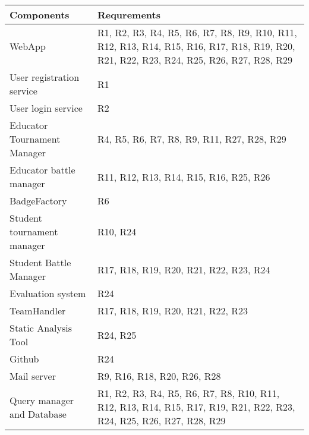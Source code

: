 \documentclass[a4paper, 11pt, titlepage]{article}
\begin{document}
\begin{center}
  \begin{tabularx}{\linewidth} {| l | X |}
    \hline
    Components & Requrements\\
    \hline
    WebApp& R1, R2, R3, R4, R5, R6, R7, R8, R9, R10, R11, R12, R13, R14, R15, R16, R17, R18, R19, R20, R21, R22, R23, R24, R25, R26, R27, R28, R29\\
    \hline
    User registration service& R1\\
    \hline
    User login service& R2\\
    \hline
    Educator Tournament Manager&R4, R5, R6, R7, R8, R9, R11, R27, R28, R29\\
    \hline
    Educator battle manager& R11, R12, R13, R14, R15, R16, R25, R26\\
    \hline
    BadgeFactory &R6\\
    \hline
    Student tournament manager&R10, R24\\
    \hline
    Student Battle Manager&R17, R18, R19, R20, R21, R22, R23, R24\\
    \hline
    Evaluation system&R24\\
    \hline
    TeamHandler& R17, R18, R19, R20, R21, R22, R23\\
    \hline
    Static Analysis Tool&R24, R25\\
    \hline
    Github& R24\\
    \hline
    Mail server& R9, R16, R18, R20, R26, R28\\
    \hline
    Query manager and Database&R1, R2, R3, R4, R5, R6, R7, R8, R10, R11, R12, R13, R14, R15, R17, R19, R21, R22, R23, R24, R25, R26, R27, R28, R29\\
    \hline
  \end{tabularx}
\end{center}

\hfill
\end{document}
